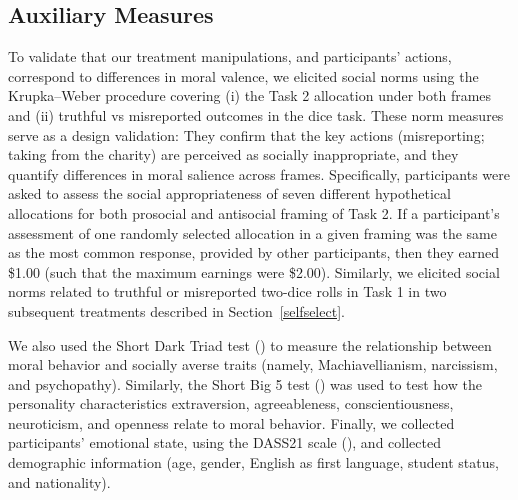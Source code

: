 \documentclass{article}
\begin{document}
\subsection{Auxiliary Measures}
To validate that our treatment manipulations, and participants' actions, correspond to differences in moral valence, we elicited social norms using the Krupka–Weber \parencite{Krupka2013} procedure covering (i) the Task 2 allocation under both frames and (ii) truthful vs misreported outcomes in the dice task. These norm measures serve as a design validation: They confirm that the key actions (misreporting; taking from the charity) are perceived as socially inappropriate, and they quantify differences in moral salience across frames. Specifically, participants were asked to assess the social appropriateness of seven different hypothetical allocations for both prosocial and antisocial framing of Task 2. If a participant's assessment of one randomly selected allocation in a given framing was the same as the most common response, provided by other participants, then they earned \$1.00 (such that the maximum earnings were \$2.00). Similarly, we elicited social norms related to truthful or misreported two-dice rolls in Task 1 in two subsequent treatments described in Section~\ref{selfselect}.
\par
We also used the Short Dark Triad test (\cite{Jones2013}) to measure the relationship between moral behavior and socially averse traits (namely, Machiavellianism, narcissism, and psychopathy). Similarly, the Short Big 5 test (\cite{Rammstedt2007}) was used to test how the personality characteristics extraversion, agreeableness, conscientiousness, neuroticism, and openness relate to moral behavior. Finally, we collected participants' emotional state, using the DASS21 scale (\cite{AlKalbani2022}), and collected demographic information (age, gender, English as first language, student status, and nationality).
\par
\end{document}
